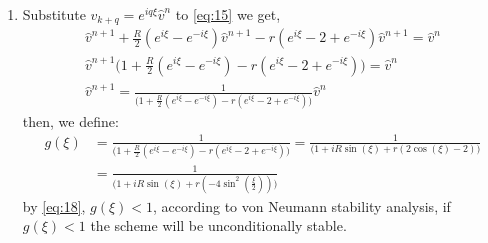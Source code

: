 \documentclass[a4paper,12pt]{article}
\begin{document}
\begin{enumerate}
	\item Substitute $v_{k+q}=e^{iq\xi}\hat{v}^n$ to \eqref{eq:15} we get,
	\begin{equation}\label{eq:17}
	\begin{aligned}
	\hat{v}^{n+1} + \frac{R}{2}(e^{i\xi} - e^{-i\xi}) \hat{v}^{n+1} - r(e^{i\xi}-2+e^{-i\xi})\hat{v}^{n+1} = \hat{v}^n\\
	\hat{v}^{n+1} \bigg( 1 + \frac{R}{2}(e^{i\xi} - e^{-i\xi}) - r(e^{i\xi}-2+e^{-i\xi}) \bigg) = \hat{v}^n\\
	\hat{v}^{n+1} = \frac{1}{\bigg( 1 + \frac{R}{2}(e^{i\xi} - e^{-i\xi}) - r(e^{i\xi}-2+e^{-i\xi}) \bigg)} \hat{v}^n
	\end{aligned}
	\end{equation}
	then, we define:
	\begin{equation}\label{eq:18}
	\begin{aligned}
	g(\xi) &= \frac{1}{\bigg( 1 + \frac{R}{2}(e^{i\xi} - e^{-i\xi}) - r(e^{i\xi}-2+e^{-i\xi}) \bigg)} = \frac{1}{\bigg(1+iR\sin(\xi) +r(2\cos(\xi)-2)\bigg)}\\ 
	&=\frac{1}{\bigg(1+iR\sin(\xi) +r(-4\sin^2(\frac{\xi}{2}))\bigg)}
	\end{aligned}
	\end{equation}
	by \eqref{eq:18}, $g(\xi)<1$, according to von Neumann stability analysis, if $g(\xi)<1$ the scheme will be unconditionally stable.
	

\end{enumerate}
\end{document}
